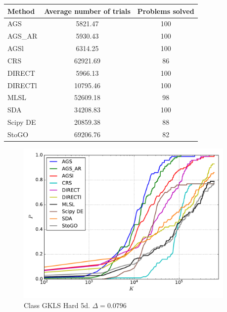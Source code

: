 \documentclass[a4paper]{article}
\begin{document}
\begin{tabular}{lcc}
\hline
 Method   &  Average number of trials  &  Problems solved  \\
\hline
 AGS      &          5821.47           &        100        \\
 AGS\_AR   &          5930.43           &        100        \\
 AGSl     &          6314.25           &        100        \\
 CRS      &          62921.69          &        86         \\
 DIRECT   &          5966.13           &        100        \\
 DIRECTl  &          10795.46          &        100        \\
 MLSL     &          52609.18          &        98         \\
 SDA      &          34208.83          &        100        \\
 Scipy DE &          20859.38          &        88         \\
 StoGO    &          69206.76          &        82         \\
\hline
\end{tabular}
\begin{figure}[H]
  \center
  \includegraphics[width=0.95\textwidth]{../experiments/gklsh5d_serg/cmc.pdf}
  \caption{Class GKLS Hard 5d. $\Delta=0.0796$}

\end{figure}
\end{document}
